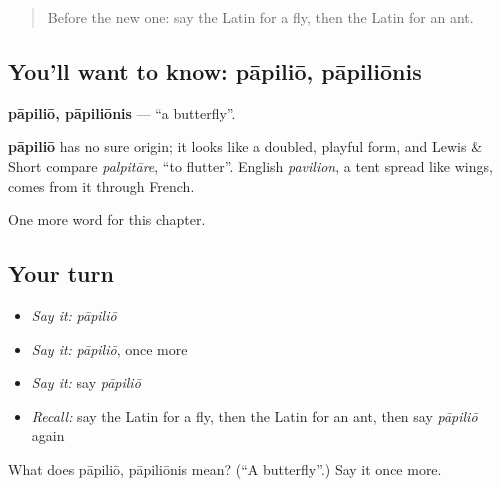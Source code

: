 \label{lesson:LA-C132-papilio}



\begin{quote}
Before the new one: say the Latin for a fly, then the Latin for an ant.
\end{quote}

\subsection*{You'll want to know: pāpiliō, pāpiliōnis}
\textbf{pāpiliō, pāpiliōnis} — \textquotedblleft{}a butterfly\textquotedblright{}.

\begin{cousinweb}
\textbf{pāpiliō} has no sure origin; it looks like a doubled, playful form, and Lewis \& Short compare \emph{palpitāre}, \textquotedblleft{}to flutter\textquotedblright{}. English \emph{pavilion}, a tent spread like wings, comes from it through French.
\end{cousinweb}

\begin{grammarlens}[title={What you've built}]
One more word for this chapter.
\end{grammarlens}

\subsection*{Your turn}
\begin{itemize}
\raggedright
  \item \emph{Say it:} \emph{pāpiliō}
  \item \emph{Say it:} \emph{pāpiliō}, once more
  \item \emph{Say it:} say \emph{pāpiliō}
  \item \emph{Recall:} say the Latin for a fly, then the Latin for an ant, then say \emph{pāpiliō} again
\end{itemize}

\begin{tcolorbox}[breakable,colback=teal!4,colframe=teal!35!black,title={Before you move on}]
What does pāpiliō, pāpiliōnis mean? (\textquotedblleft{}A butterfly\textquotedblright{}.) Say it once more.
\end{tcolorbox}
